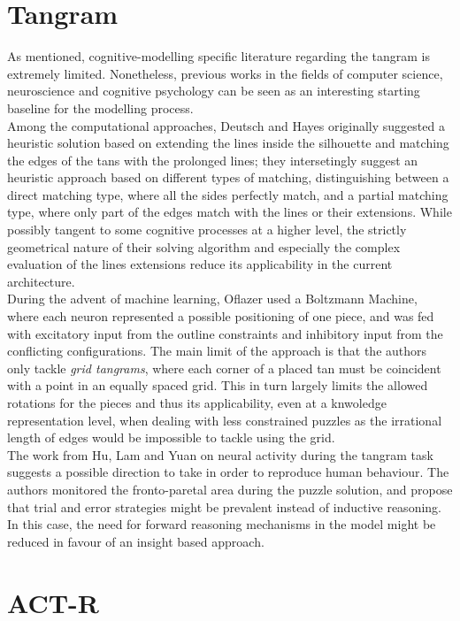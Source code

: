 \documentclass[a4paper,singleside,12pt]{report} %
\begin{document}
	\section{Tangram}
	As mentioned, cognitive-modelling specific literature regarding the tangram is extremely
	limited. Nonetheless, previous works in the fields of computer science, neuroscience and cognitive psychology
	can be seen as an interesting starting baseline for the modelling process. \\Among the
	computational approaches, Deutsch and Hayes \cite{heuristic} originally suggested a heuristic
	solution based on extending the lines inside the silhouette and matching the edges of the tans
	with the prolonged lines; they intersetingly suggest an heuristic approach based on different
	types of matching, distinguishing between a direct matching type, where all the sides perfectly
	match, and a partial matching type, where only part of the edges match with the lines or their
	extensions. While possibly tangent to some cognitive processes at a higher level, the strictly
	geometrical nature of their solving algorithm and especially the complex evaluation of the lines
	extensions reduce its applicability in the current architecture.\\
	During the advent of machine learning, Oflazer \cite{Oflazer1993SolvingTP} used a Boltzmann
	Machine, where each neuron represented a possible positioning of one piece, and was fed with
	excitatory input from the outline constraints and inhibitory input from the conflicting
	configurations. The main limit of the approach is that the authors only tackle \textit{grid
	tangrams}, where each corner of a placed tan must be coincident with a point in an equally
	spaced grid. This in turn largely limits the allowed rotations for the pieces and thus its
	applicability, even at a knwoledge representation level, when dealing with less constrained
	puzzles as the irrational length of edges would be impossible to tackle using the grid. \\
	The work from Hu, Lam and Yuan \cite{Hu2019EffectiveCO} on neural activity during the tangram
	task suggests a possible direction to take in order to reproduce human behaviour. The authors
	monitored the fronto-paretal area during the puzzle solution, and propose that trial and error
	strategies might be prevalent instead of inductive reasoning. In this case, the need for
	forward reasoning mechanisms in the model might be reduced in favour of an insight based
	approach. 
	
	\section{ACT-R}
\end{document}
